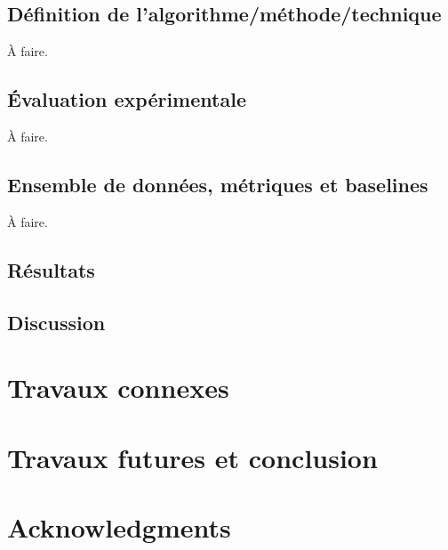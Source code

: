 \documentclass[11pt,a4paper, french]{article}
\begin{document}
\subsection{Définition de l'algorithme/méthode/technique}
À faire.

\subsection{Évaluation expérimentale }

À faire. 

\subsection{Ensemble de données, métriques et baselines }

À faire. 



\subsection{Résultats}


\subsection{Discussion}


\section{Travaux connexes}



\section{Travaux futures et conclusion }

\section*{Acknowledgments}
 

%
%

\appendix
\end{document}
